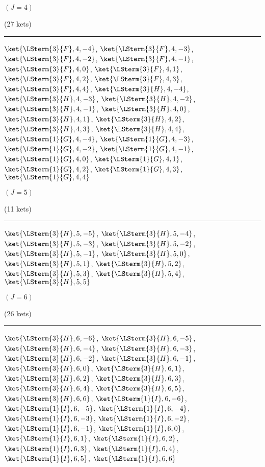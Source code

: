 \begin{mdframed}
\begin{center}
$(J=4)$


(27 kets)
\vspace{0.25cm}\hrule\vspace{0.25cm}
$\ket{\LSterm{3}{F},4,-4}$, $\ket{\LSterm{3}{F},4,-3}$, $\ket{\LSterm{3}{F},4,-2}$, $\ket{\LSterm{3}{F},4,-1}$, $\ket{\LSterm{3}{F},4,0}$, $\ket{\LSterm{3}{F},4,1}$, $\ket{\LSterm{3}{F},4,2}$, $\ket{\LSterm{3}{F},4,3}$, $\ket{\LSterm{3}{F},4,4}$, $\ket{\LSterm{3}{H},4,-4}$, $\ket{\LSterm{3}{H},4,-3}$, $\ket{\LSterm{3}{H},4,-2}$, $\ket{\LSterm{3}{H},4,-1}$, $\ket{\LSterm{3}{H},4,0}$, $\ket{\LSterm{3}{H},4,1}$, $\ket{\LSterm{3}{H},4,2}$, $\ket{\LSterm{3}{H},4,3}$, $\ket{\LSterm{3}{H},4,4}$, $\ket{\LSterm{1}{G},4,-4}$, $\ket{\LSterm{1}{G},4,-3}$, $\ket{\LSterm{1}{G},4,-2}$, $\ket{\LSterm{1}{G},4,-1}$, $\ket{\LSterm{1}{G},4,0}$, $\ket{\LSterm{1}{G},4,1}$, $\ket{\LSterm{1}{G},4,2}$, $\ket{\LSterm{1}{G},4,3}$, $\ket{\LSterm{1}{G},4,4}$
\end{center}
\end{mdframed}

\begin{mdframed}
\begin{center}
$(J=5)$


(11 kets)
\vspace{0.25cm}\hrule\vspace{0.25cm}
$\ket{\LSterm{3}{H},5,-5}$, $\ket{\LSterm{3}{H},5,-4}$, $\ket{\LSterm{3}{H},5,-3}$, $\ket{\LSterm{3}{H},5,-2}$, $\ket{\LSterm{3}{H},5,-1}$, $\ket{\LSterm{3}{H},5,0}$, $\ket{\LSterm{3}{H},5,1}$, $\ket{\LSterm{3}{H},5,2}$, $\ket{\LSterm{3}{H},5,3}$, $\ket{\LSterm{3}{H},5,4}$, $\ket{\LSterm{3}{H},5,5}$
\end{center}
\end{mdframed}

\begin{mdframed}
\begin{center}
$(J=6)$


(26 kets)
\vspace{0.25cm}\hrule\vspace{0.25cm}
$\ket{\LSterm{3}{H},6,-6}$, $\ket{\LSterm{3}{H},6,-5}$, $\ket{\LSterm{3}{H},6,-4}$, $\ket{\LSterm{3}{H},6,-3}$, $\ket{\LSterm{3}{H},6,-2}$, $\ket{\LSterm{3}{H},6,-1}$, $\ket{\LSterm{3}{H},6,0}$, $\ket{\LSterm{3}{H},6,1}$, $\ket{\LSterm{3}{H},6,2}$, $\ket{\LSterm{3}{H},6,3}$, $\ket{\LSterm{3}{H},6,4}$, $\ket{\LSterm{3}{H},6,5}$, $\ket{\LSterm{3}{H},6,6}$, $\ket{\LSterm{1}{I},6,-6}$, $\ket{\LSterm{1}{I},6,-5}$, $\ket{\LSterm{1}{I},6,-4}$, $\ket{\LSterm{1}{I},6,-3}$, $\ket{\LSterm{1}{I},6,-2}$, $\ket{\LSterm{1}{I},6,-1}$, $\ket{\LSterm{1}{I},6,0}$, $\ket{\LSterm{1}{I},6,1}$, $\ket{\LSterm{1}{I},6,2}$, $\ket{\LSterm{1}{I},6,3}$, $\ket{\LSterm{1}{I},6,4}$, $\ket{\LSterm{1}{I},6,5}$, $\ket{\LSterm{1}{I},6,6}$
\end{center}
\end{mdframed}
